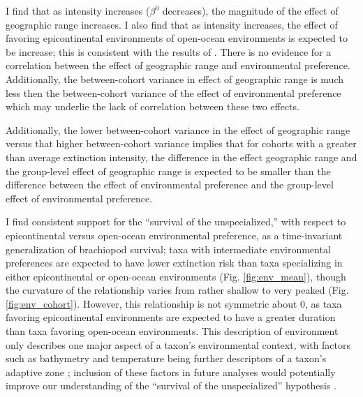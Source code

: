 \documentclass{article}
\begin{document}
I find that as intensity increases (\(\beta^{0}\) decreases), the magnitude of the effect of geographic range increases. I also find that as intensity increases, the effect of favoring epicontinental environments of open-ocean environments is expected to be increase; this is consistent with the results of \citet{Miller2009a}. There is no evidence for a correlation between the effect of geographic range and environmental preference. Additionally, the between-cohort variance in effect of geographic range is much less then the between-cohort variance of the effect of environmental preference which may underlie the lack of correlation between these two effects.

Additionally, the lower between-cohort variance in the effect of geographic range versus that higher between-cohort variance implies that for cohorts with a greater than average extinction intensity, the difference in the effect geographic range and the group-level effect of geographic range is expected to be smaller than the difference between the effect of environmental preference and the group-level effect of environmental preference.

I find consistent support for the ``survival of the unspecialized,'' with respect to epicontinental versus open-ocean environmental preference, as a time-invariant generalization of brachiopod survival; taxa with intermediate environmental preferences are expected to have lower extinction risk than taxa specializing in either epicontinental or open-ocean environments (Fig. \ref{fig:env_mean}), though the curvature of the relationship varies from rather shallow to very peaked (Fig. \ref{fig:env_cohort}). However, this relationship is not symmetric about 0, as taxa favoring epicontinental environments are expected to have a greater duration than taxa favoring open-ocean environments. This description of environment only describes one major aspect of a taxon's environmental context, with factors such as bathymetry and temperature being further descriptors of a taxon's adaptive zone \citep{Nurnberg2013a,Harnik2013,Harnik2011,Heim2011}; inclusion of these factors in future analyses would potentially improve our understanding of the ``survival of the unspecialized'' hypothesis \citep{Simpson1944}.
\end{document}
